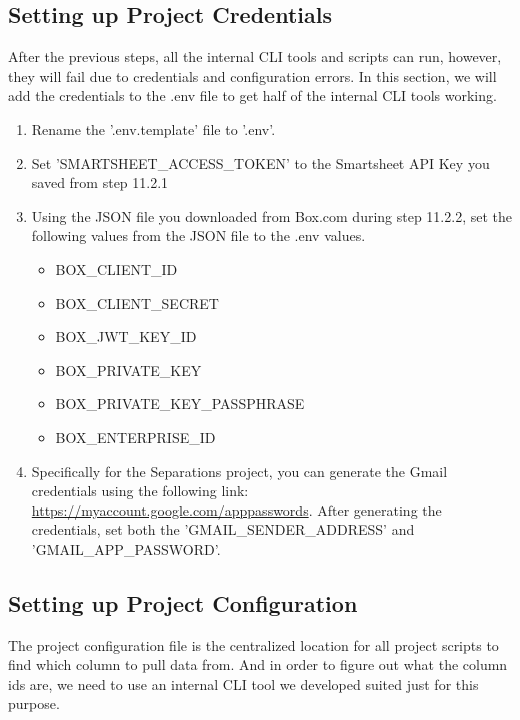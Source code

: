 \documentclass[12pt]{article}
\begin{document}
\subsection{Setting up Project Credentials}
After the previous steps, all the internal CLI tools and scripts can run, however, they will fail due to credentials and configuration errors. In this section, we will add the credentials to the .env file to get half of the internal CLI tools working.
\begin{enumerate}
    \item Rename the '.env.template' file to '.env'.
    \item Set 'SMARTSHEET\_ACCESS\_TOKEN' to the Smartsheet API Key you saved from step 11.2.1
    \item Using the JSON file you downloaded from Box.com during step 11.2.2, set the following values from the JSON file to the .env values.
        \begin{itemize}
            \item BOX\_CLIENT\_ID
            \item BOX\_CLIENT\_SECRET
            \item BOX\_JWT\_KEY\_ID
            \item BOX\_PRIVATE\_KEY
            \item BOX\_PRIVATE\_KEY\_PASSPHRASE
            \item BOX\_ENTERPRISE\_ID
        \end{itemize}
    \item Specifically for the Separations project, you can generate the Gmail credentials using the following link: \url{https://myaccount.google.com/apppasswords}. After generating the credentials, set both the 'GMAIL\_SENDER\_ADDRESS' and 'GMAIL\_APP\_PASSWORD'.
\end{enumerate}

\subsection{Setting up Project Configuration}
The project configuration file  is the centralized location for all project scripts to find which column to pull data from. And in order to figure out what the column ids are, we need to use an internal CLI tool we developed suited just for this purpose.
\end{document}
